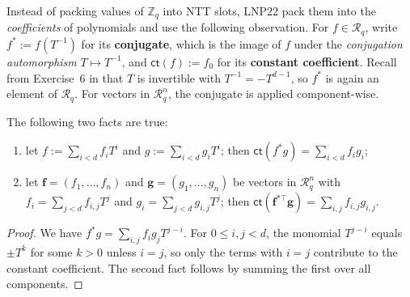 \documentclass[../../book.tex]{subfiles}
\begin{document}
Instead of packing values of $\mathbb{Z}_q$ into NTT slots, LNP22 pack them into the \emph{coefficients} of polynomials and use the following observation.
For $f \in \mathcal{R}_q$, write $f^{\ast} := f(T^{-1})$ for its \textbf{conjugate}, which is the image of $f$ under the \emph{conjugation automorphism} $T \mapsto T^{-1}$, and $\mathsf{ct}(f) := f_0$ for its \textbf{constant coefficient}.
Recall from Exercise~6 in  that $T$ is invertible with $T^{-1} = -T^{d-1}$, so $f^{\ast}$ is again an element of $\mathcal{R}_q$.
For vectors in $\mathcal{R}_q^n$, the conjugate is applied component-wise.

\begin{lemma}\label{lemma:constant-coefficient}
    The following two facts are true:
    \begin{enumerate}
        \item[\textit{(i)}] let $f := \sum_{i<d} f_iT^i$ and $g := \sum_{i<d} g_iT^i$; then $\mathsf{ct}(f^{\ast}g) = \sum_{i<d} f_ig_i$;
        \item[\textit{(ii)}] let $\mathbf{f} = (f_1,\dots,f_n)$ and $\mathbf{g} = (g_1,\dots,g_n)$ be vectors in $\mathcal{R}_q^n$ with $f_i = \sum_{j<d} f_{i,j}T^j$ and $g_i = \sum_{j<d} g_{i,j}T^j$; then $\mathsf{ct}(\mathbf{f}^{\ast\top}\mathbf{g}) = \sum_{i,j} f_{i,j}g_{i,j}$.
    \end{enumerate}
\end{lemma}

\begin{proof}
    We have $f^{\ast}g = \sum_{i,j} f_ig_jT^{j-i}$.
    For $0 \leq i,j < d$, the monomial $T^{j-i}$ equals $\pm T^{k}$ for some $k>0$ unless $i = j$, so only the terms with $i = j$ contribute to the constant coefficient.
    The second fact follows by summing the first over all components.
\end{proof}
\end{document}
